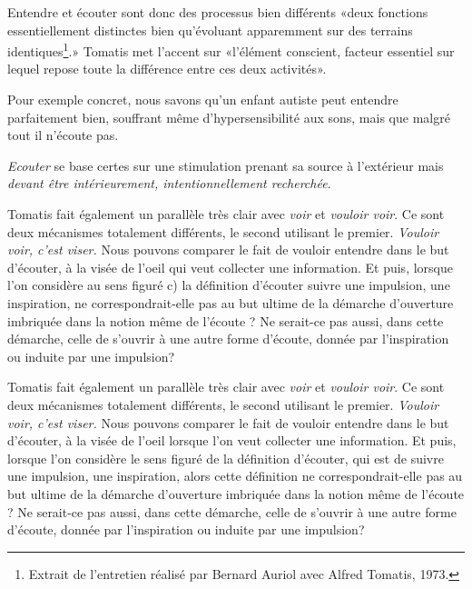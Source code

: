Entendre et écouter sont donc des processus bien différents «deux
fonctions essentiellement distinctes bien qu'évoluant apparemment sur
des terrains identiques\footnote{Extrait de l'entretien réalisé par
  Bernard Auriol avec Alfred Tomatis, 1973.}.» Tomatis met l'accent
sur «l'élément conscient, facteur essentiel sur lequel repose toute la
différence entre ces deux activités».

Pour exemple concret, nous savons qu'un enfant autiste peut entendre
parfaitement bien, souffrant même d'hypersensibilité aux sons, mais
que malgré tout il n'écoute pas. %

\emph{Ecouter} se base certes sur une stimulation prenant sa source à
l'extérieur mais \emph{devant être intérieurement, intentionnellement
  recherchée}.


Tomatis fait également un parallèle très clair avec \emph{voir} et
\emph{vouloir voir}. Ce sont deux mécanismes totalement différents, le
second utilisant le premier. \emph{Vouloir voir, c'est viser.}  Nous
pouvons comparer le fait de vouloir entendre dans le but d'écouter, à
la visée de l'oeil qui veut collecter une information.  Et puis,
lorsque l'on considère au sens figuré c) la définition d'écouter 
suivre une impulsion, une inspiration, ne correspondrait-elle pas au
but ultime de la démarche d'ouverture imbriquée dans la notion même de
l'écoute ? Ne serait-ce pas aussi, dans cette démarche, celle de
s'ouvrir à une autre forme d'écoute, donnée par l'inspiration ou
induite par une impulsion?

Tomatis fait également un parallèle très clair avec \emph{voir} et
\emph{vouloir voir}. Ce sont deux mécanismes totalement différents, le
second utilisant le premier. \emph{Vouloir voir, c'est viser.}  Nous
pouvons comparer le fait de vouloir entendre dans le but d'écouter, à
la visée de l'oeil lorsque l'on veut collecter une information.  Et
puis, lorsque l'on considère le sens figuré de la définition
d'écouter, qui est de suivre une impulsion, une inspiration, alors
cette définition ne correspondrait-elle pas au but ultime de la
démarche d'ouverture imbriquée dans la notion même de l'écoute ?
Ne serait-ce pas aussi, dans cette démarche, celle de s'ouvrir à une
autre forme d'écoute, donnée par l'inspiration ou induite par une
impulsion?


